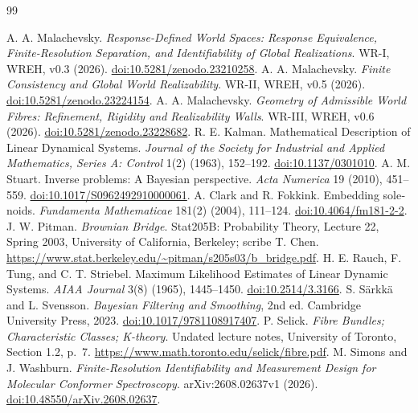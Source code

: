 \clearpage
\begin{english}
\renewcommand{\refname}{\Lang{References}{Литература}}
\begin{thebibliography}{99}
\raggedright
{} A. A. Malachevsky. \emph{Response-Defined World Spaces: Response Equivalence, Finite-Resolution Separation, and Identifiability of Global Realizations}. WR-I, WREH, v0.3 (2026). \href{https://doi.org/10.5281/zenodo.23210258}{doi:10.5281/zenodo.23210258}.
 A. A. Malachevsky. \emph{Finite Consistency and Global World Realizability}. WR-II, WREH, v0.5 (2026). \href{https://doi.org/10.5281/zenodo.23224154}{doi:10.5281/zenodo.23224154}.
 A. A. Malachevsky. \emph{Geometry of Admissible World Fibres: Refinement, Rigidity and Realizability Walls}. WR-III, WREH, v0.6 (2026). \href{https://doi.org/10.5281/zenodo.23228682}{doi:10.5281/zenodo.23228682}.
 R. E. Kalman. Mathematical Description of Linear Dynamical Systems. \emph{Journal of the Society for Industrial and Applied Mathematics, Series A: Control} 1(2) (1963), 152--192. \href{https://doi.org/10.1137/0301010}{doi:10.1137/0301010}.
 A. M. Stuart. Inverse problems: A Bayesian perspective. \emph{Acta Numerica} 19 (2010), 451--559. \href{https://doi.org/10.1017/S0962492910000061}{doi:10.1017/S0962492910000061}.
 A. Clark and R. Fokkink. Embedding solenoids. \emph{Fundamenta Mathematicae} 181(2) (2004), 111--124. \href{https://doi.org/10.4064/fm181-2-2}{doi:10.4064/fm181-2-2}.
 J. W. Pitman. \emph{Brownian Bridge}. Stat205B: Probability Theory, Lecture 22, Spring 2003, University of California, Berkeley; scribe T. Chen. \url{https://www.stat.berkeley.edu/~pitman/s205s03/b_bridge.pdf}.
 H. E. Rauch, F. Tung, and C. T. Striebel. Maximum Likelihood Estimates of Linear Dynamic Systems. \emph{AIAA Journal} 3(8) (1965), 1445--1450. \href{https://doi.org/10.2514/3.3166}{doi:10.2514/3.3166}.
 S. S\"arkk\"a and L. Svensson. \emph{Bayesian Filtering and Smoothing}, 2nd ed. Cambridge University Press, 2023. \href{https://doi.org/10.1017/9781108917407}{doi:10.1017/9781108917407}.
 P. Selick. \emph{Fibre Bundles; Characteristic Classes; K-theory}. Undated lecture notes, University of Toronto, Section 1.2, p.~7. \url{https://www.math.toronto.edu/selick/fibre.pdf}.
 M. Simons and J. Washburn. \emph{Finite-Resolution Identifiability and Measurement Design for Molecular Conformer Spectroscopy}. arXiv:2608.02637v1 (2026). \href{https://doi.org/10.48550/arXiv.2608.02637}{doi:10.48550/arXiv.2608.02637}.
\end{thebibliography}
\end{english}

